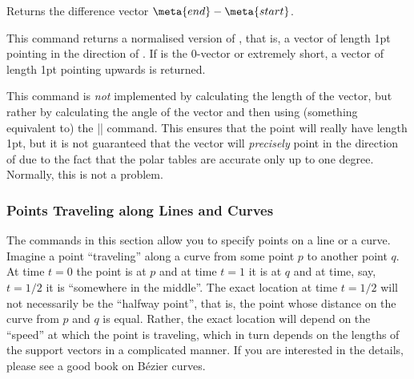 \begin{command}{\pgfpointdiff{}}
    Returns the difference vector $\meta{end} - \meta{start}$.
\begin{codeexample}[]
\end{codeexample}
\end{command}

\begin{command}{\pgfpointnormalised{}}
    This command returns a normalised version of , that is, a
    vector of length 1pt pointing in the direction of . If
     is the $0$-vector or extremely short, a vector of length 1pt
    pointing upwards is returned.

    This command is \emph{not} implemented by calculating the length of the
    vector, but rather by calculating the angle of the vector and then using
    (something equivalent to) the |\pgfpointpolar| command. This ensures that
    the point will really have length 1pt, but it is not guaranteed that the
    vector will \emph{precisely} point in the direction of  due to
    the fact that the polar tables are accurate only up to one degree.
    Normally, this is not a problem.
\begin{codeexample}[]
\end{codeexample}
\end{command}


\subsubsection{Points Traveling along Lines and Curves}
\label{section-pointsattime}

The commands in this section allow you to specify points on a line or a curve.
Imagine a point ``traveling'' along a curve from some point $p$ to another
point $q$. At time $t=0$ the point is at $p$ and at time $t=1$ it is at $q$ and
at time, say, $t=1/2$ it is ``somewhere in the middle''. The exact location at
time $t=1/2$ will not necessarily be the ``halfway point'', that is, the point
whose distance on the curve from $p$ and $q$ is equal. Rather, the exact
location will depend on the ``speed'' at which the point is traveling, which in
turn depends on the lengths of the support vectors in a complicated manner. If
you are interested in the details, please see a good book on Bézier curves.

